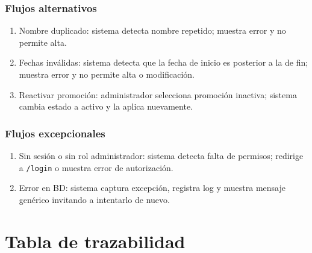 \documentclass[12pt,a4paper]{article}
\begin{document}
\subsubsection*{Flujos alternativos}
\begin{enumerate}[label=FA-\arabic*]
    \item Nombre duplicado: sistema detecta nombre repetido; muestra error y no permite alta.
    \item Fechas inválidas: sistema detecta que la fecha de inicio es posterior a la de fin; muestra error y no permite alta o modificación.
    \item Reactivar promoción: administrador selecciona promoción inactiva; sistema cambia estado a activo y la aplica nuevamente.
\end{enumerate}

\subsubsection*{Flujos excepcionales}
\begin{enumerate}[label=FE-\arabic*]
    \item Sin sesión o sin rol administrador: sistema detecta falta de permisos; redirige a \texttt{/login} o muestra error de autorización.
    \item Error en BD: sistema captura excepción, registra log y muestra mensaje genérico invitando a intentarlo de nuevo.
\end{enumerate}


\section{Tabla de trazabilidad}
\end{document}
